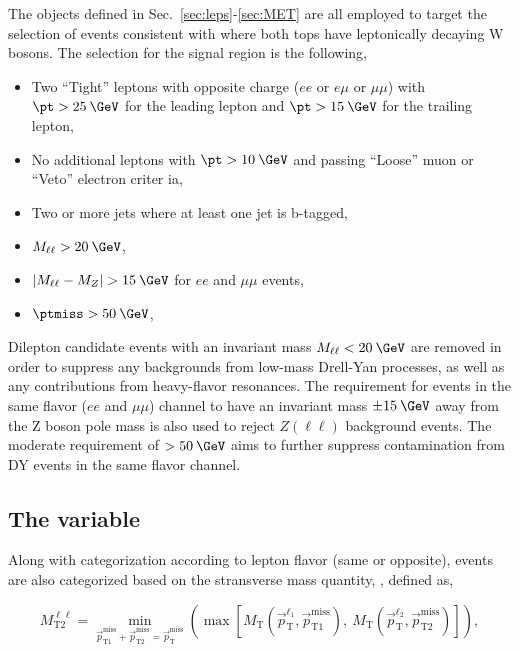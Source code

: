 The objects defined in Sec.~\ref{sec:leps}-\ref{sec:MET} are all employed to target the selection of events consistent with \ttMET where both tops have leptonically decaying W bosons. The selection for the signal region is the following,

\begin{itemize}
\item Two ``Tight'' leptons with opposite charge ($ee$ or $e\mu$ or $\mu\mu$) with $\pt>25\:\GeV$ for 
the leading lepton and $\pt>15\:\GeV$ for the trailing lepton,
\item No additional leptons with $\pt>10\:\GeV$ and passing ``Loose'' muon or ``Veto'' electron criter
ia,
\item Two or more jets where at least one jet is b-tagged,
\item $M_{\ell\ell}>20\:\GeV$,
\item $|M_{\ell\ell} - M_Z|>15\:\GeV$ for $ee$ and $\mu\mu$ events,
\item $\ptmiss>50\:\GeV$,
\end{itemize}

Dilepton candidate events with an invariant mass $M_{\ell\ell}<20\:\GeV$ are removed in order to suppress any backgrounds from low-mass Drell-Yan processes, as well as any contributions from heavy-flavor resonances. The requirement for events in the same flavor ($ee$ and $\mu\mu$) channel to have an invariant mass $\pm15\:\GeV$ away from the Z boson pole mass is also used to reject $Z(\ell\ell)$ background events. The moderate requirement of \ptmiss$>50\:\GeV$ aims to further suppress contamination from DY events in the same flavor channel.

\subsection{The \mttll variable}
\label{subsec:mt2ll}

Along with categorization according to lepton flavor (same or opposite), events are also categorized based on the stransverse mass quantity, \mttll, defined as,

\begin{equation}
  M_{\text{T2}}^{\ell\ell} = \min_{\vec{p}^{\text{miss}}_{\text{T1}}+\vec{p}^{\text{miss}}_{\text{T2}}=\vec{p}^{\text{miss}}_{\text{T}}}\left(\max\left[M_{\text{T}}\left(\vec{p}^{\ell_1}_{\text{T}},\vec{p}^{\text{miss}}_{\text{T1}}\right),\:M_{\text{T}}\left(\vec{p}^{\ell_2}_{\text{T}},\vec{p}^{\text{miss}}_{\text{T2}}\right)\right]\right),
  \label{eq:mt2ll}
\end{equation}

